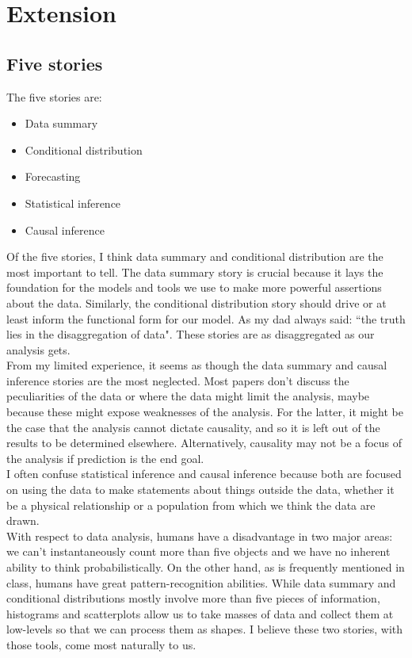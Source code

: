 \documentclass{article}
\begin{document}
\section{Extension}
\subsection{Five stories}
The five stories are:
\begin{itemize}
\item Data summary
\item Conditional distribution
\item Forecasting
\item Statistical inference
\item Causal inference
\end{itemize}

Of the five stories, I think data summary and conditional distribution are the most important to tell. The data summary story is crucial because it lays the foundation for the models and tools we use to make more powerful assertions about the data. Similarly, the conditional distribution story should drive or at least inform the functional form for our model. As my dad always said: ``the truth lies in the disaggregation of data". These stories are as disaggregated as our analysis gets.\\

From my limited experience, it seems as though the data summary and causal inference stories are the most neglected. Most papers don't discuss the peculiarities of the data or where the data might limit the analysis, maybe because these might expose weaknesses of the analysis. For the latter, it might be the case that the analysis cannot dictate causality, and so it is left out of the results to be determined elsewhere. Alternatively, causality may not be a focus of the analysis if prediction is the end goal.\\

I often confuse statistical inference and causal inference because both are focused on using the data to make statements about things outside the data, whether it be a physical relationship or a population from which we think the data are drawn.\\

With respect to data analysis, humans have a disadvantage in two major areas: we can't instantaneously count more than five objects and we have no inherent ability to think probabilistically. On the other hand, as is frequently mentioned in class, humans have great pattern-recognition abilities. While data summary and conditional distributions mostly involve more than five pieces of information, histograms and scatterplots allow us to take masses of data and collect them at low-levels so that we can process them as shapes. I believe these two stories, with those tools, come most naturally to us.\\
\end{document}
